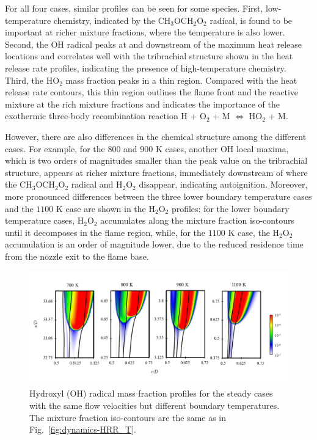 For all four cases, similar profiles can be seen for some species.  First, low-temperature chemistry, indicated by the CH$_3$OCH$_2$O$_2$ radical, is found to be important at richer mixture fractions, where the temperature is also lower.  Second, the OH radical peaks at and downstream of the maximum heat release locations and correlates well with the tribrachial structure shown in the heat release rate profiles, indicating the presence of high-temperature chemistry.  Third, the HO$_2$ mass fraction peaks in a thin region.  Compared with the heat release rate contours, this thin region outlines the flame front and the reactive mixture at the rich mixture fractions and indicates the importance of the exothermic three-body recombination reaction H + O$_2$ + M $\Longleftrightarrow$ HO$_2$ + M.

However, there are also differences in the chemical structure among the different cases.  For example, for the $800$ and $900$ K cases, another OH local maxima, which is two orders of magnitudes smaller than the peak value on the tribrachial structure, appears at richer mixture fractions, immediately downstream of where the CH$_3$OCH$_2$O$_2$ radical and H$_2$O$_2$ disappear, indicating autoignition.  Moreover, more pronounced differences between the three lower boundary temperature cases and the $1100$ K case are shown in the H$_2$O$_2$ profiles: for the lower boundary temperature cases, H$_2$O$_2$ accumulates along the mixture fraction iso-contours  until it decomposes in the flame region, while, for the $1100$ K case, the H$_2$O$_2$ accumulation is an order of magnitude lower, due to the reduced residence time from the nozzle exit to the flame base.

\begin{figure}[t]
  \centering
  \scriptsize
  \includegraphics[width=1.0\textwidth]{ch-dynamics/OH_T.png}
  \normalsize
  \caption{Hydroxyl (OH) radical mass fraction profiles for the steady cases with the same flow velocities but different boundary temperatures.  The mixture fraction iso-contours are the same as in Fig.~\ref{fig:dynamics-HRR_T}.}
  \label{fig:OH_T}
\end{figure}

